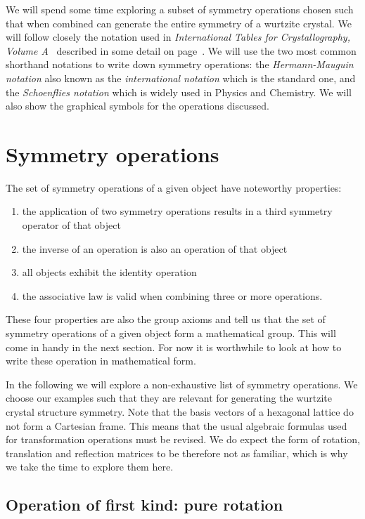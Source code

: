 We will spend some time exploring a subset of symmetry operations chosen such that when combined can generate the entire symmetry of a wurtzite crystal. We will follow closely the notation used in \textit{International Tables for Crystallography, Volume A}~\cite{IntTableCrysA} described in some detail on page~\pageref{chap:int}. We will use the two most common shorthand notations to write down symmetry operations: the \textit{Hermann-Mauguin notation} also known as the \textit{international notation} which is the standard one, and the \textit{Schoenflies notation} which is widely used in Physics and Chemistry. We will also show the graphical symbols for the operations discussed.


\section{Symmetry operations}
\label{chap:symOp}
The set of symmetry operations of a given object have noteworthy properties:
\begin{enumerate}
\item the application of two symmetry operations results in a third symmetry operator of that object
\item the inverse of an operation is also an operation of that object
\item all objects exhibit the identity operation
\item the associative law is valid when combining three or more operations.
\end{enumerate}
These four properties are also the group axioms and tell us that the set of symmetry operations of a given object form a mathematical group. This will come in handy in the next section. For now it is worthwhile to look at how to write these operation in mathematical form.

In the following we will explore a non-exhaustive list of symmetry operations. We choose our examples such that they are relevant for generating the wurtzite crystal structure symmetry. Note that the  basis vectors of a hexagonal lattice do not form a Cartesian frame. This means that the usual algebraic formulas used for transformation operations must be revised. We do expect the form of rotation, translation and reflection matrices to be therefore not as familiar, which is why we take the time to explore them here. 



\subsection{Operation of first kind: pure rotation}
\label{sec:pureRot}

